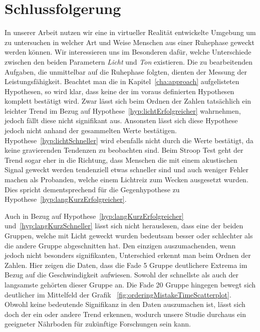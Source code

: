 \chapter{Schlussfolgerung}


In unserer Arbeit nutzen wir eine in virtueller Realität entwickelte Umgebung um zu untersuchen in welcher Art und Weise Menschen aus einer Ruhephase geweckt werden können.
Wir interessieren uns im Besonderen dafür, welche Unterschiede zwischen den beiden Parametern \textit{Licht} und \textit{Ton} existieren. Die zu bearbeitenden Aufgaben, die unmittelbar auf die Ruhephase folgten, dienten der Messung der Leistungsfähigkeit.
Beachtet man die in Kapitel~\ref{cha:approach} aufgelisteten Hypothesen, so wird klar, dass keine der im voraus definierten Hypothesen komplett bestätigt wird. 
Zwar lässt sich beim Ordnen der Zahlen tatsächlich ein leichter Trend im Bezug auf Hypothese~\ref{hyp:lichtErfolgreicher} wahrnehmen, jedoch fällt diese nicht signifikant aus. 
Ansonsten lässt sich diese Hypothese jedoch nicht anhand der gesammelten Werte bestätigen. 
Hypothese~\ref{hyp:lichtSchneller} wird ebenfalls nicht durch die Werte bestätigt, da keine gravierenden Tendenzen zu beobachten sind.
Beim Stroop Test geht der Trend sogar eher in die Richtung, dass Menschen die mit einem akustischen Signal geweckt werden tendenziell etwas schneller sind und auch weniger Fehler machen als Probanden, welche einem Lichtreiz zum Wecken ausgesetzt wurden.
Dies spricht dementsprechend für die Gegenhypothese zu Hypothese~\ref{hyp:langKurzErfolgreicher}.

Auch in Bezug auf Hypothese~\ref{hyp:langKurzErfolgreicher} und~\ref{hyp:langKurzSchneller} lässt sich nicht herauslesen, dass eine der beiden Gruppen, welche mit Licht geweckt wurden bedeutsam besser oder schlechter als die andere Gruppe abgeschnitten hat. 
Den einzigen auszumachenden, wenn jedoch nicht besonders signifikanten, Unterschied erkennt man beim Ordnen der Zahlen. 
Hier zeigen die Daten, dass die Fade 5 Gruppe deutlichere Extrema im Bezug auf die Geschwindigkeit aufwiesen. 
Sowohl der schnellste als auch der langsamste gehörten dieser Gruppe an. 
Die Fade 20 Gruppe hingegen bewegt sich deutlicher im Mittelfeld der Grafik ~\ref{fig:orderingMistakeTimeScatterplot}.
Obwohl keine bedeutende Signifikanz in den Daten auszumachen ist, lässt sich doch der ein oder andere Trend erkennen, wodurch unsere Studie durchaus ein geeigneter Nährboden für zukünftige Forschungen sein kann. 

